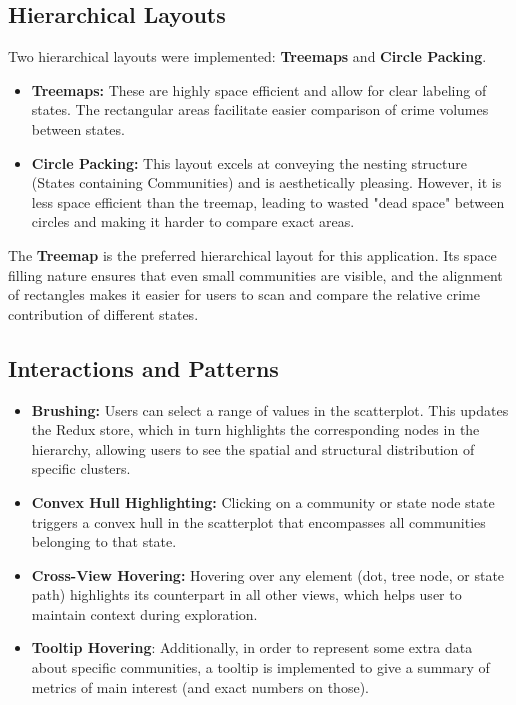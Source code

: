 \documentclass[11pt]{article}
\begin{document}
\subsection{Hierarchical Layouts}
Two hierarchical layouts were implemented: \textbf{Treemaps} and \textbf{Circle Packing}.
\begin{itemize}
    \item \textbf{Treemaps:} These are highly space efficient and allow for clear labeling of states. The rectangular areas facilitate easier comparison of crime volumes between states. 
    \item \textbf{Circle Packing:} This layout excels at conveying the nesting structure (States containing Communities) and is aesthetically pleasing. However, it is less space efficient than the treemap, leading to wasted "dead space" between circles and making it harder to compare exact areas.
\end{itemize}


The \textbf{Treemap} is the preferred hierarchical layout for this application. Its space filling nature ensures that even small communities are visible, and the alignment of rectangles makes it easier for users to scan and compare the relative crime contribution of different states.

\subsection{Interactions and Patterns}
\begin{itemize}
    \item \textbf{Brushing:} Users can select a range of values in the scatterplot. This updates the Redux store, which in turn highlights the corresponding nodes in the hierarchy, allowing users to see the spatial and structural distribution of specific clusters.
    \item \textbf{Convex Hull Highlighting:} Clicking on a community or state node state triggers a convex hull in the scatterplot that encompasses all communities belonging to that state. 
    \item \textbf{Cross-View Hovering:} Hovering over any element (dot, tree node, or state path) highlights its counterpart in all other views, which helps user to maintain context during exploration.
    \item \textbf{Tooltip Hovering}: Additionally, in order to represent some extra data about specific communities, a tooltip is implemented to give a summary of metrics of main interest (and exact numbers on those).
\end{itemize}
\end{document}
